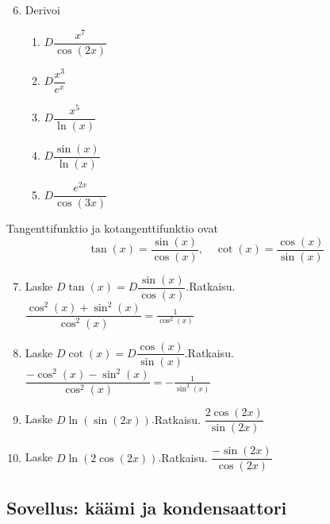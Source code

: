 \documentclass[10pt]{article}
\newcommand{\ratkaisu}[1]{\hfill{\color{blue}\quad\textrm{Ratkaisu. } #1}}
\begin{document}
\begin{enumerate}
\setcounter{enumi}{5}
\item Derivoi
\begin{enumerate}
\item $D\dfrac{x^7}{\cos(2x)}$
\item $D\dfrac{x^3}{e^{x}}$
\item $D\dfrac{x^5}{\ln(x)}$
\item $D\dfrac{\sin(x)}{\ln(x)}$
\item $D\dfrac{e^{2x}}{\cos(3x)}$
\end{enumerate}
\end{enumerate}

Tangenttifunktio ja kotangenttifunktio ovat
$$
\tan(x)=\frac{\sin(x)}{\cos(x)},\quad \cot(x)=\frac{\cos(x)}{\sin(x)}
$$

\begin{enumerate}
\setcounter{enumi}{6}
\item Laske $D\tan(x)=D\dfrac{\sin(x)}{\cos(x)}$.\ratkaisu{$\dfrac{\cos^2(x)+\sin^2(x)}{\cos^2(x)}=\frac{1}{\cos^2(x)}$}
\item Laske $D\cot(x)=D\dfrac{\cos(x)}{\sin(x)}$.\ratkaisu{$\dfrac{-\cos^2(x)-\sin^2(x)}{\cos^2(x)}=-\frac{1}{\sin^2(x)}$}
\item Laske $D\ln(\sin(2x))$.\ratkaisu{$\dfrac{2\cos(2x)}{\sin(2x)}$}
\item Laske $D\ln(2\cos(2x))$.\ratkaisu{$\dfrac{-\sin(2x)}{\cos(2x)}$}
\end{enumerate}

\newpage

\subsection{Sovellus: käämi ja kondensaattori}
\end{document}
